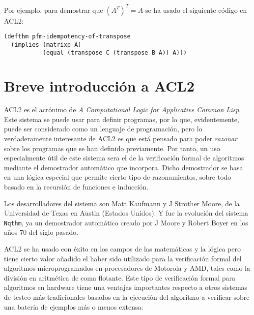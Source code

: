 \documentclass[a4paper,10pt]{article}
\begin{document}
Por ejemplo, para demostrar que $(A^T)^T=A$ se ha usado el siguiente código en ACL2:

\par\vspace{10pt}

\begin{lstlisting}[language=clips]
(defthm pfm-idempotency-of-transpose
  (implies (matrixp A)
           (equal (transpose C (transpose B A)) A)))
\end{lstlisting}

\newpage
\vspace{24pt}
\section{Breve introducción a ACL2}

ACL2 es el acrónimo de \emph{A Computational Logic for Applicative Common Lisp}. Este sistema se puede usar para definir programas, por lo que, evidentemente, puede ser considerado como un lenguaje de programación, pero lo verdaderamente interesante de ACL2 es que está pensado para poder \emph{razonar} sobre los programas que se han definido previamente. Por tanto, un uso especialmente útil de este sistema sera el de la verificación formal de algoritmos mediante el demostrador automático que incorpora. Dicho demostrador se basa en una lógica especial que permite cierto tipo de razonamientos, sobre todo basado en la recursión de funciones e inducción.

\par\vspace{10pt}

Los desarrolladores del sistema son Matt Kaufmann y J Strother Moore, de la Universidad de Texas en Austin (Estados Unidos). Y fue la evolución del sistema \texttt{Nqthm}, ya un demostrador automático creado por J Moore y Robert Boyer en los años 70 del siglo pasado.

\par\vspace{10pt}

ACL2 se ha usado con éxito en los campos de las matemáticas y la lógica pero tiene cierto valor añadido el haber sido utilizado para la verificación formal del algoritmos microprogramados en procesadores de Motorola\textsuperscript{\textregistered} y AMD\textsuperscript{\textregistered}, tales como la división en aritmética de coma flotante. Este tipo de verificación formal para algoritmos en hardware tiene una ventajas importantes respecto a otros sistemas de testeo más tradicionales basados en la ejecución del algoritmo a verificar sobre una batería de ejemplos más o menos extensa:
\end{document}

